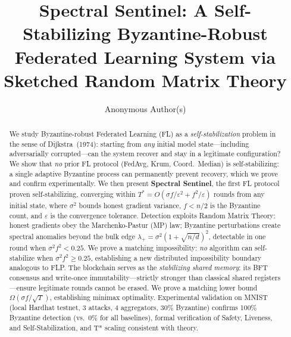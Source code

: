 \documentclass[runningheads]{llncs}
\begin{document}
\title{Spectral Sentinel: A Self-Stabilizing Byzantine-Robust\\
Federated Learning System via Sketched Random Matrix Theory}

\author{Anonymous Author(s)}

\maketitle

\begin{abstract}
We study Byzantine-robust Federated Learning (FL) as a \emph{self-stabilization} problem in the sense of Dijkstra~(1974): starting from \emph{any} initial model state---including adversarially corrupted---can the system recover and stay in a legitimate configuration? We show that \emph{no} prior FL protocol (FedAvg, Krum, Coord.\ Median) is self-stabilizing: a single adaptive Byzantine process can permanently prevent recovery, which we prove and confirm experimentally. We then present \textbf{Spectral Sentinel}, the first FL protocol proven self-stabilizing, converging within $T^* = O(\sigma f/\varepsilon^2 + f^2/\varepsilon)$ rounds from any initial state, where $\sigma^2$ bounds honest gradient variance, $f < n/2$ is the Byzantine count, and $\varepsilon$ is the convergence tolerance. Detection exploits Random Matrix Theory: honest gradients obey the Marchenko-Pastur (MP) law; Byzantine perturbations create spectral anomalies beyond the bulk edge $\lambda_+ = \sigma^2(1+\sqrt{n/d})^2$, detectable in one round when $\sigma^2 f^2 < 0.25$. We prove a matching impossibility: \emph{no} algorithm can self-stabilize when $\sigma^2 f^2 \geq 0.25$, establishing a new distributed impossibility boundary analogous to FLP. The blockchain serves as the \emph{stabilizing shared memory}: its BFT consensus and write-once immutability---strictly stronger than classical shared registers---ensure legitimate rounds cannot be erased. We prove a matching lower bound $\Omega(\sigma f/\sqrt{T})$, establishing minimax optimality. Experimental validation on MNIST (local Hardhat testnet, 3 attacks, 4 aggregators, 30\% Byzantine) confirms 100\% Byzantine detection (vs.\ 0\% for all baselines), formal verification of Safety, Liveness, and Self-Stabilization, and T* scaling consistent with theory.
\end{abstract}

\end{document}
